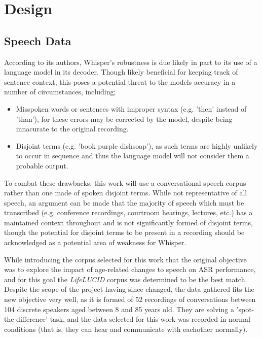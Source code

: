 \chapter{Design}\label{ch:design}

\section{Speech Data}

According to its authors, Whisper's robustness is due likely in part to its use of a language model in its decoder\cite{whisper}.
Though likely beneficial for keeping track of sentence context, this poses a potential threat to the models accuracy in a number of circumstances, including;

\begin{itemize}
  \item Misspoken words or sentences with improper syntax (e.g. 'then' instead of 'than'), for these errors may be corrected by the model, despite being innacurate to the original recording.
  \item Disjoint terms (e.g. 'book purple dishsoap'), as such terms are highly unlikely to occur in sequence and thus the language model will not consider them a probable output.
\end{itemize}

To combat these drawbacks, this work will use a conversational speech corpus rather than one made of spoken disjoint terms.
While not representative of all speech, an argument can be made that the majority of speech which must be transcribed (e.g. conference recordings, courtroom hearings, lectures, etc.) has a maintained context throughout and is not significantly formed of disjoint terms, though the potential for disjoint terms to be present in a recording should be acknowledged as a potential area of weakness for Whisper.

While introducing the corpus selected for this work that the original objective was to explore the impact of age-related changes to speech on ASR performance, and for this goal the \emph{LifeLUCID} corpus\cite{lifelucid} was determined to be the best match.
Despite the scope of the project having since changed, the data gathered fits the new objective very well, as it is formed of 52 recordings of conversations between 104 discrete speakers aged between 8 and 85 years old.
They are solving a 'spot-the-difference' task, and the data selected for this work was recorded in normal conditions (that is, they can hear and communicate with eachother normally).

